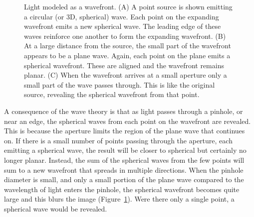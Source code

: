 \documentclass[
  letterpaper,
]{book}
\begin{document}
\begin{figure}


\caption{\label{fig-huygens-waves}Light modeled as a wavefront. (A) A
point source is shown emitting a circular (or 3D, spherical) wave. Each
point on the expanding wavefront emits a new spherical wave. The leading
edge of these waves reinforce one another to form the expanding
wavefront. (B) At a large distance from the source, the small part of
the wavefront appears to be a plane wave. Again, each point on the plane
emits a spherical wavefront. These are aligned and the wavefront remains
planar. (C) When the wavefront arrives at a small aperture only a small
part of the wave passes through. This is like the original source,
revealing the spherical wavefront from that point.}

\end{figure}%

A consequence of the wave theory is that as light passes through a
pinhole, or near an edge, the spherical waves from each point on the
wavefront are revealed. This is because the aperture limits the region
of the plane wave that continues on. If there is a small number of
points passing through the aperture, each emitting a spherical wave, the
result will be closer to spherical but certainly no longer planar.
Instead, the sum of the spherical waves from the few points will sum to
a new wavefront that spreads in multiple directions. When the pinhole
diameter is small, and only a small portion of the plane wave compared
to the wavelength of light enters the pinhole, the spherical wavefront
becomes quite large and this blurs the image
(Figure~\ref{fig-huygens-waves}). Were there only a single point, a
spherical wave would be revealed.
\end{document}
